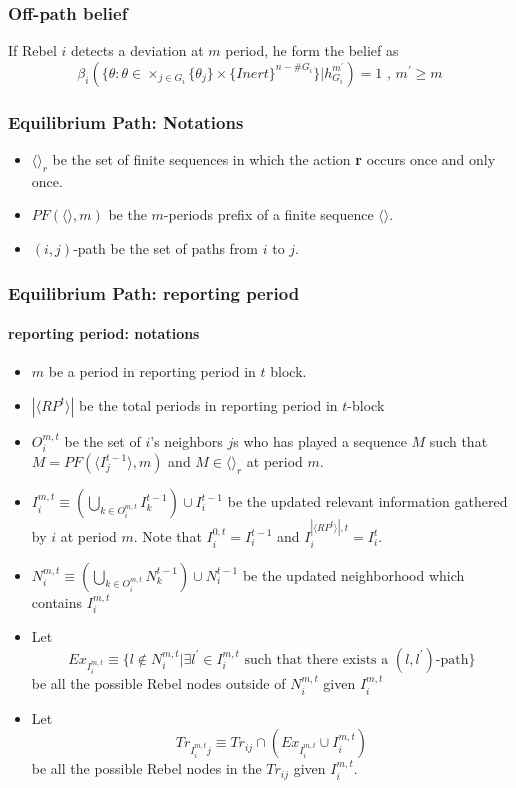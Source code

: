 \documentclass[12pt,letterpaper]{article}
\theoremstyle{definition}
\theoremstyle{remark}
\theoremstyle{claim}
\begin{document}
\subsubsection{Off-path belief}

If Rebel $i$ detects a deviation at $m$ period, he form the belief as
\begin{equation}
\beta_{i}(\{\theta:\theta\in \times_{j\in G_i}\{\theta_j\}\times\{Inert\}^{n-\#G_i}\}|h^{m^{'}}_{G_i})=1 \text{ , } m^{'}\geq m
\end{equation}



\subsubsection{Equilibrium Path: Notations}


\begin{itemize}

\item $\langle \rangle_r$ be the set of finite sequences in which the action \textbf{r} occurs once and only once.
\item $PF(\langle \rangle,m)$ be the $m$-periods prefix of a finite sequence $\langle \rangle$.
\item $(i,j)$-path be the set of paths from $i$ to $j$.

\end{itemize}

\subsubsection{Equilibrium Path: reporting period}

\paragraph{reporting period: notations}
\begin{itemize}
\item $m$ be a period in reporting period in $t$ block.
\item $|\langle RP^t \rangle|$ be the total periods in reporting period in $t$-block
\item $O^{m,t}_i$ be the set of $i$'s neighbors $j$s who has played a sequence $M$ such that $M=PF(\langle I^{t-1}_j \rangle,m)$ and $M \in \langle \rangle_r$ at period $m$. 
\item $I^{m,t}_i\equiv (\bigcup_{k\in O^{m,t}_i} I^{t-1}_k)\cup I^{t-1}_i$ be the updated relevant information gathered by $i$ at period $m$. Note that $I^{0,t}_i=I^{t-1}_i$ and $I^{|\langle RP^t \rangle|,t }_i=I^{t}_i$.
\item $N^{m,t}_i\equiv (\bigcup_{k\in O^{m,t}_i} N^{t-1}_k)\cup N^{t-1}_i$
be the updated neighborhood which contains $I^{m,t}_i$

\item Let 
\[Ex_{I^{m,t}_i}\equiv \{l\notin N^{m,t}_i|\exists l^{'}\in I^{m,t}_i\text{ such that there exists a $(l,l^{'})$-path}\}\]
be all the possible Rebel nodes outside of $N^{m,t}_i$ given $I^{m,t}_i$
\item Let
\[Tr_{I^{m,t}_ij}\equiv Tr_{ij}\cap (Ex_{I^{m,t}_i}\cup I^{m,t}_i)\]
be all the possible Rebel nodes in the $Tr_{ij}$ given $I^{m,t}_i$. 
\end{itemize}
\end{document}
